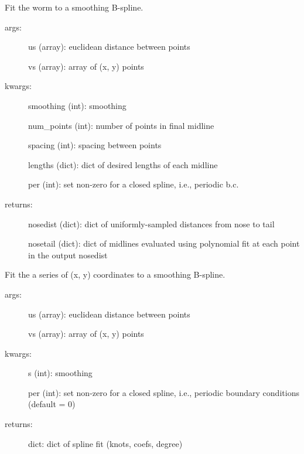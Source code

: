 \documentclass[letterpaper,10pt,openany,oneside]{sphinxmanual}
\begin{document}
\begin{fulllineitems}
\label{index:splinefit.main}
Fit the worm to a smoothing B-spline.
\begin{description}
\item[{args:}] \leavevmode
us (array): euclidean distance between points

vs (array): array of (x, y) points

\item[{kwargs:}] \leavevmode
smoothing (int): smoothing

num\_points (int): number of points in final midline

spacing (int): spacing between points

lengths (dict): dict of desired lengths of each midline

per (int): set non-zero for a closed spline, i.e., periodic b.c.

\item[{returns:}] \leavevmode
nosedist (dict): dict of uniformly-sampled distances from nose to tail

nosetail (dict): dict of midlines evaluated using polynomial fit at 
each point in the output nosedist

\end{description}

\end{fulllineitems}


\begin{fulllineitems}
\label{index:splinefit.makebspline}
Fit the a series of (x, y) coordinates to a smoothing B-spline.
\begin{description}
\item[{args:}] \leavevmode
us (array): euclidean distance between points

vs (array): array of (x, y) points

\item[{kwargs:}] \leavevmode
s (int): smoothing

per (int): set non-zero for a closed spline, i.e., periodic boundary
conditions (default = 0)

\item[{returns:}] \leavevmode
dict: dict of spline fit (knots, coefs, degree)

\end{description}

\end{fulllineitems}
\end{document}
